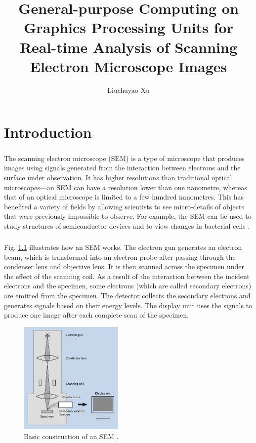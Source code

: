 \documentclass[12pt, twocolumn]{report}
\author{Liuchuyao Xu}
\title{General-purpose Computing on Graphics Processing Units for Real-time Analysis of Scanning Electron Microscope Images}
\begin{document}
\maketitle

\begin{abstract}
\end{abstract}

\chapter{Introduction}
\paragraph{}
The scanning electron microscope (SEM) is a type of microscope that produces images using signals generated from the interaction between electrons and the surface under observation. It has higher resolutions than traditional optical microscopes---an SEM can have a resolution lower than one nanometre, whereas that of an optical microscope is limited to a few hundred nanometres. This has benefited a variety of fields by allowing scientists to see micro-details of objects that were previously impossible to observe. For example, the SEM can be used to study structures of semiconductor devices \cite{SEM for semiconductors} and to view changes in bacterial cells \cite{SEM for baterial cells}.

\paragraph{}
Fig. \ref{SEM basic construction} illustrates how an SEM works. The electron gun generates an electron beam, which is transformed into an electron probe after passing through the condenser lens and objective lens. It is then scanned across the specimen under the effect of the scanning coil. As a result of the interaction between the incident electrons and the specimen, some electrons (which are called secondary electrons) are emitted from the specimen. The detector collects the secondary electrons and generates signals based on their energy levels. The display unit uses the signals to produce one image after each complete scan of the specimen.

\begin{figure}[htbp]
    \centering
    \includegraphics[width=0.45\textwidth]{Figures/SEM basic construction.jpg}
    \caption{Basic construction of an SEM \cite{SEM A to Z}.}
    \label{SEM basic construction}
\end{figure}
\end{document}
